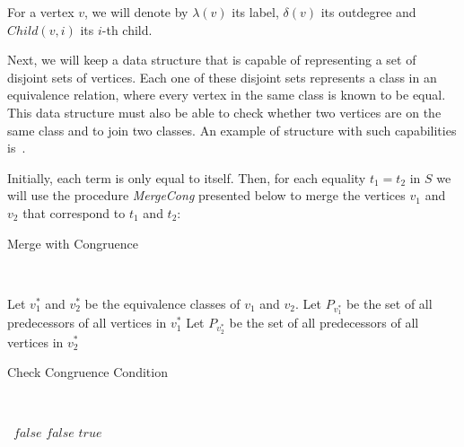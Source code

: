 For a vertex $v$, we will denote by $\lambda(v)$ its label, $\delta(v)$ its outdegree and $Child(v, i)$ its $i$-th child.

Next, we will keep a data structure that is capable of representing a set of disjoint sets of vertices. Each one of these disjoint sets represents a class in an equivalence relation, where every vertex in the same class is known to be equal. This data structure must also be able to check whether two vertices are on the same class and to join two classes. An example of structure with such capabilities is~\cite{union_find}.

Initially, each term is only equal to itself. Then, for each equality $t_{1} = t_{2}$ in $S$ we will use the procedure \textit{MergeCong} presented below to merge the vertices $v_{1}$ and $v_{2}$ that correspond to $t_{1}$ and $t_{2}$:

\renewcommand{\algorithmicforall}{\textbf{for each}}
\MakeRobust{\Call}


\begin{algorithm}[H]
\caption{Merge with Congruence}~\label{merge_cong}
\begin{algorithmic}[1]
    \State\Return
  \EndIf
  \State Let $v_{1}^{*}$ and $v_{2}^{*}$ be the equivalence classes of $v_{1}$ and $v_{2}$.
  \State Let $P_{v_{1}^{*}}$ be the set of all predecessors of all vertices in $v_{1}^{*}$
  \State Let $P_{v_{2}^{*}}$ be the set of all predecessors of all vertices in $v_{2}^{*}$
  \State{}
      \State{}
    \EndIf
  \EndFor
  \EndFunction
\end{algorithmic}
\end{algorithm}

\begin{algorithm}[H]
\caption{Check Congruence Condition}~\label{cong_cond}
\begin{algorithmic}[1]
    \State\Return~$false$
  \EndIf
      \State\Return $false$
    \EndIf
  \EndFor
  \State\Return $true$
  \EndFunction
\end{algorithmic}
\end{algorithm}


